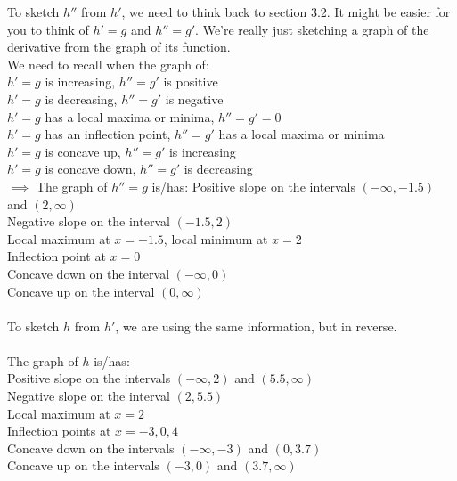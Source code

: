 \documentclass[nooutcomes]{ximera}
\begin{document}
\begin{problem}
\begin{freeResponse}
				
To sketch $h''$ from $h'$, we need to think back to section 3.2.  It might be easier for you to think of $h'=g$ and $h''=g'$.  We're really just sketching a graph of the derivative from the graph of its function.  \\

We need to recall when the graph of:\\
$h'=g$ is increasing, $h''=g'$ is positive\\
$h'=g$ is decreasing, $h''=g'$ is negative\\
$h'=g$ has a local maxima or minima, $h''=g'=0$\\
$h'=g$ has an inflection point, $h''=g'$ has a local maxima or minima\\
$h'=g$ is concave up, $h''=g'$ is increasing\\
$h'=g$ is concave down, $h''=g'$ is decreasing\\

$\implies$
The graph of $h''=g$ is/has:
Positive slope on the intervals $(-\infty,-1.5)$ and $(2,\infty)$\\
Negative slope on the interval $(-1.5,2)$\\
Local maximum at $x=-1.5$, local minimum at $x=2$\\
Inflection point at $x=0$\\
Concave down on the interval $(-\infty,0)$\\
Concave up on the interval $(0,\infty)$\\\\

To sketch $h$ from $h'$, we are using the same information, but in reverse.  \\\\
The graph of $h$ is/has:\\
Positive slope on the intervals $(-\infty,2)$ and $(5.5,\infty)$\\
Negative slope on the interval $(2,5.5)$\\
Local maximum at $x=2$\\
Inflection points at $x=-3,0,4$\\
Concave down on the intervals  $(-\infty,-3)$ and $(0,3.7)$\\
Concave up on the intervals $(-3,0)$ and $(3.7,\infty)$


		
						
\end{freeResponse}
\end{problem}
\end{document}
